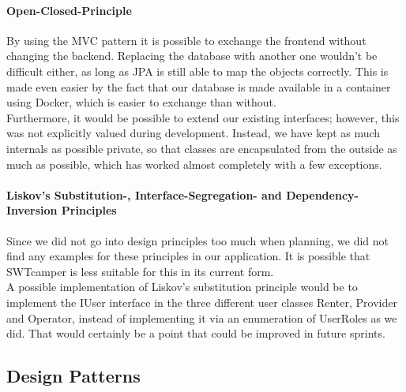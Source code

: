 \paragraph{Open-Closed-Principle}
\label{subsec:solid:ocp}
By using the MVC pattern it is possible to exchange the frontend without changing the backend. Replacing the database with another one wouldn't be difficult either, as long as JPA is still able to map the objects correctly. This is made even easier by the fact that our database is made available in a container using Docker, which is easier to exchange than without. \\
Furthermore, it would be possible to extend our existing interfaces; however, this was not explicitly valued during development. Instead, we have kept as much internals as possible private, so that classes are encapsulated from the outside as much as possible, which has worked almost completely with a few exceptions.

\paragraph{Liskov's Substitution-, Interface-Segregation- and Dependency-Inversion Principles}
Since we did not go into design principles too much when planning, we did not find any examples for these principles in our application. It is possible that SWTcamper is less suitable for this in its current form. \\
A possible implementation of Liskov's substitution principle would be to implement the IUser interface in the three different user classes Renter, Provider and Operator, instead of implementing it via an enumeration of UserRoles as we did. That would certainly be a point that could be improved in future sprints.

\subsection{Design Patterns}

